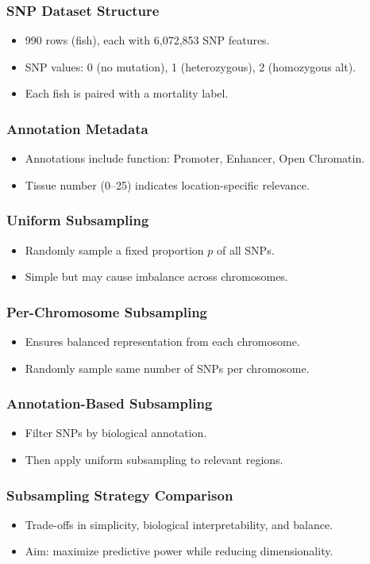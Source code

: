 \documentclass[aspectratio=169]{beamer}
\begin{document}
\begin{frame}
\frametitle{SNP Dataset Structure}
\begin{itemize}
  \item 990 rows (fish), each with 6,072,853 SNP features.
  \item SNP values: 0 (no mutation), 1 (heterozygous), 2 (homozygous alt).
  \item Each fish is paired with a mortality label.
\end{itemize}
\end{frame}

\begin{frame}
\frametitle{Annotation Metadata}
\begin{itemize}
  \item Annotations include function: Promoter, Enhancer, Open Chromatin.
  \item Tissue number (0–25) indicates location-specific relevance.
\end{itemize}
\end{frame}

\begin{frame}
\frametitle{Uniform Subsampling}
\begin{itemize}
  \item Randomly sample a fixed proportion $p$ of all SNPs.
  \item Simple but may cause imbalance across chromosomes.
\end{itemize}
\end{frame}

\begin{frame}
\frametitle{Per-Chromosome Subsampling}
\begin{itemize}
  \item Ensures balanced representation from each chromosome.
  \item Randomly sample same number of SNPs per chromosome.
\end{itemize}
\end{frame}

\begin{frame}
\frametitle{Annotation-Based Subsampling}
\begin{itemize}
  \item Filter SNPs by biological annotation.
  \item Then apply uniform subsampling to relevant regions.
\end{itemize}
\end{frame}

\begin{frame}
\frametitle{Subsampling Strategy Comparison}
\begin{itemize}
  \item Trade-offs in simplicity, biological interpretability, and balance.
  \item Aim: maximize predictive power while reducing dimensionality.
\end{itemize}
\end{frame}
\end{document}
